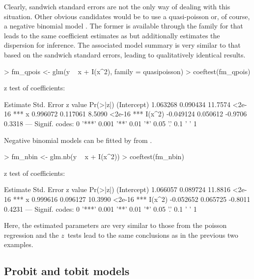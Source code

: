 \documentclass{Z}
\begin{document}
Clearly, sandwich standard errors are not the only way of
dealing with this situation. Other obvious candidates would be to use a
quasi-poisson or, of course, a negative binomial model \citep{hac:McCullagh+Nelder:1989}.
The former is available through the  family for 
that leads to the same coefficient estimates as  but additionally
estimates the dispersion for inference. The associated model summary is very
similar to that based on the sandwich standard errors, leading to qualitatively
identical results.

\begin{Schunk}
\begin{Sinput}
> fm_qpois <- glm(y ~ x + I(x^2), family = quasipoisson)
> coeftest(fm_qpois)
\end{Sinput}
\begin{Soutput}
z test of coefficients:

             Estimate Std. Error z value Pr(>|z|)    
(Intercept)  1.063268   0.090434 11.7574   <2e-16 ***
x            0.996072   0.117061  8.5090   <2e-16 ***
I(x^2)      -0.049124   0.050612 -0.9706   0.3318    
---
Signif. codes:  0 '***' 0.001 '**' 0.01 '*' 0.05 '.' 0.1 ' ' 1 
\end{Soutput}
\end{Schunk}

Negative binomial models can be fitted by  from  
\citep{hac:Venables+Ripley:2002}.

\begin{Schunk}
\begin{Sinput}
> fm_nbin <- glm.nb(y ~ x + I(x^2))
> coeftest(fm_nbin)
\end{Sinput}
\begin{Soutput}
z test of coefficients:

             Estimate Std. Error z value Pr(>|z|)    
(Intercept)  1.066057   0.089724 11.8816   <2e-16 ***
x            0.999616   0.096127 10.3990   <2e-16 ***
I(x^2)      -0.052652   0.065725 -0.8011   0.4231    
---
Signif. codes:  0 '***' 0.001 '**' 0.01 '*' 0.05 '.' 0.1 ' ' 1 
\end{Soutput}
\end{Schunk}

Here, the estimated parameters are very similar to those from the poisson regression
and the $z$~tests lead to the same conclusions as in the previous two examples.


\subsection{Probit and tobit models}
\end{document}
